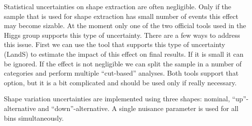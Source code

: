 Statistical uncertainties on shape extraction are often
negligible. Only if the sample that is used for shape extraction has
small number of events this effect may become sizable. At the moment
only one of the two official tools used in the Higgs group supports
this type of uncertainty. There are a few ways to address this
issue. First we can use the tool that supports this type of
uncertainty (LandS) to estimate the impact of this effect on final
results. If it is small it can be ignored. If the effect is not
negligible we can split the sample in a number of categories and
perform multiple ``cut-based'' analyses. Both tools support that
option, but it is a bit complicated and should be used only if really
necessary.

Shape variation uncertainties are implemented using three shapes:
nominal, ``up''-alternative and ``down''-alternative. A single
nuisance parameter is used for all bins simultaneously.
